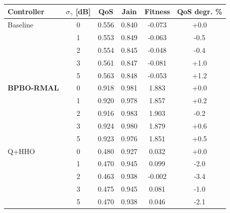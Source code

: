 \begin{tabular}{lccccc}
\hline
\textbf{Controller} & $\sigma_\gamma$ [dB] & \textbf{QoS} & \textbf{Jain} & \textbf{Fitness} & \textbf{QoS degr. \%} \\
\hline
Baseline & 0 & 0.556 & 0.840 & -0.073 & +0.0 \\
 & 1 & 0.553 & 0.849 & -0.063 & -0.5 \\
 & 2 & 0.554 & 0.845 & -0.048 & -0.4 \\
 & 3 & 0.561 & 0.847 & -0.081 & +1.0 \\
 & 5 & 0.563 & 0.848 & -0.053 & +1.2 \\
\hline
\textbf{BPBO-RMAL} & 0 & 0.918 & 0.981 & 1.883 & +0.0 \\
 & 1 & 0.920 & 0.978 & 1.857 & +0.2 \\
 & 2 & 0.916 & 0.983 & 1.903 & -0.2 \\
 & 3 & 0.924 & 0.980 & 1.879 & +0.6 \\
 & 5 & 0.923 & 0.976 & 1.851 & +0.5 \\
\hline
Q+HHO & 0 & 0.480 & 0.927 & 0.032 & +0.0 \\
 & 1 & 0.470 & 0.945 & 0.099 & -2.0 \\
 & 2 & 0.463 & 0.938 & -0.002 & -3.4 \\
 & 3 & 0.475 & 0.945 & 0.081 & -1.0 \\
 & 5 & 0.470 & 0.938 & 0.046 & -2.1 \\
\hline
\end{tabular}